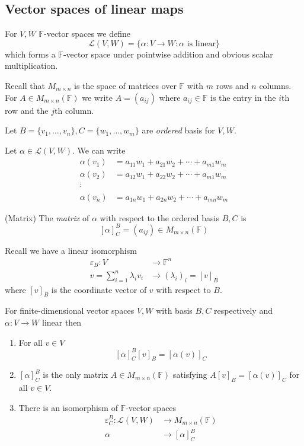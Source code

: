 \documentclass{article}
\newcommand{\F}{\mathbb{F}}
\begin{document}
\subsection{Vector spaces of linear maps}
\begin{definition}
  For $ V,W $ $ \F $-vector spaces we define
  \[
	  \mathcal L(V,W)=\{\alpha:V\to W:\alpha\text{ is linear} \}
  \]
  which forms a $ \F $-vector space under pointwise addition and obvious scalar multiplication.
\end{definition}
Recall that $ M_{m\times n} $ is the space of matrices over $ \F $ with $ m $ rows and $ n $ columns. For $ A\in M_{m\times n}(\F) $ we write $ A=(a_{ij}) $ where $ a_{ij}\in \F $ is the entry in the $ i $th row and the $ j $th column.\par
Let $ B=\{v_1,\dots, v_n\}, C=\{w_1,\dots, w_m\} $ are \textit{ordered} basis for $ V,W $.\par
Let $ \alpha\in\mathcal L(V,W) $. We can write
\begin{align*}
	\alpha(v_1)&=a_{11}w_1+a_{21}w_2+\cdots + a_{m1}w_m\\
	\alpha(v_2)&=a_{12}w_1+a_{22}w_2+\cdots + a_{m1}w_m\\
	^\vdots\\
	\alpha(v_n)&=a_{1n}w_1+a_{2n}w_2+\cdots +a_{mn}w_m
\end{align*}
\begin{definition}
	(Matrix) The \textit{matrix} of $ \alpha $ with respect to the ordered basis $ B,C $ is
	\[
		[\alpha]^B_C=(a_{ij})\in M_{m\times n}(\F)
	\]
\end{definition}
Recall we have a linear isomorphism
\begin{align*}
	\varepsilon_B:V &\to \F^n\\
	v=\sum_{i=1}^n\lambda_iv_i &\to (\lambda_i)_i=[v]_B
\end{align*}
where $ [v]_B $ is the coordinate vector of $ v $ with respect to $ B $.
\begin{theorem}
  For finite-dimensional vector spaces $ V,W $ with basis $ B,C $ respectively and $ \alpha:V\to W $ linear  then
  \begin{enumerate}
	  \item For all $ v\in V $
		  \[
			  [\alpha]^B_C[v]_B=[\alpha(v)]_C
		  \]
	  \item $ [\alpha]_C^B $ is the only matrix $ A\in M_{m\times n}(\F) $ satisfying $ A[v]_B =[\alpha(v)]_C $ for all $ v\in V $.
	  \item There is an isomorphism of $ \F $-vector spaces
		  \begin{align*}
			  \varepsilon_C^B:\mathcal L(V,W)&\to M_{m\times n}(\F)\\
			  \alpha &\to [\alpha]^B_C
		  \end{align*}
  \end{enumerate}
\end{theorem}
\end{document}
